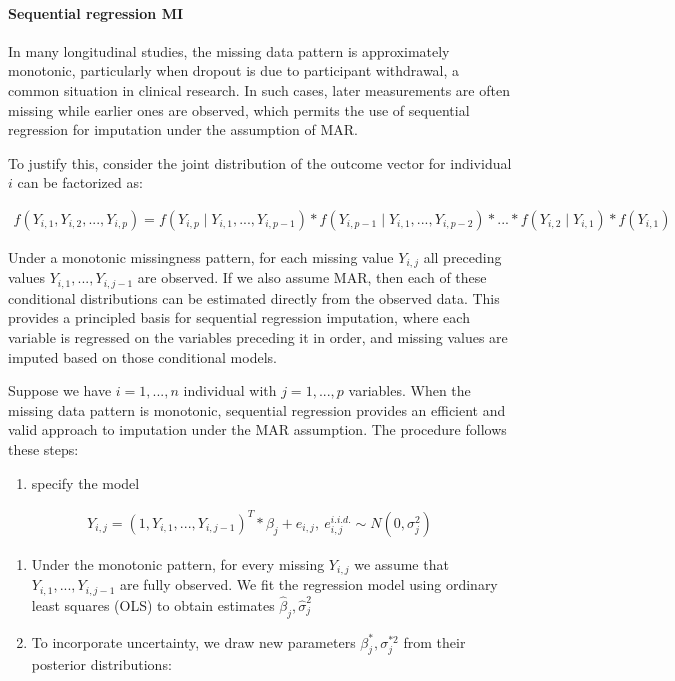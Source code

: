 \documentclass{article}
\providecommand{\tightlist}{%
  \setlength{\itemsep}{0pt}\setlength{\parskip}{0pt}}
\begin{document}
\paragraph{Sequential regression MI}\label{sequential-regression-mi}

In many longitudinal studies, the missing data pattern is approximately
monotonic, particularly when dropout is due to participant withdrawal, a
common situation in clinical research. In such cases, later measurements
are often missing while earlier ones are observed, which permits the use
of sequential regression for imputation under the assumption of MAR.

To justify this, consider the joint distribution of the outcome vector
for individual \(i\) can be factorized as:

\begin{align*}
    f(Y_{i,1},Y_{i,2},...,Y_{i,p}) = f(Y_{i,p} \mid Y_{i,1},...,Y_{i,p-1}) * 
    f(Y_{i,p-1} \mid Y_{i,1},...,Y_{i,p-2}) * ... * f(Y_{i,2} \mid Y_{i,1}) 
    * f(Y_{i,1})
    \end{align*}

Under a monotonic missingness pattern, for each missing value
\(Y_{i,j}\) all preceding values \(Y_{i,1},...,Y_{i,j-1}\) are observed.
If we also assume MAR, then each of these conditional distributions can
be estimated directly from the observed data. This provides a principled
basis for sequential regression imputation, where each variable is
regressed on the variables preceding it in order, and missing values are
imputed based on those conditional models.

Suppose we have \(i=1,...,n\) individual with \(j=1,...,p\) variables.
When the missing data pattern is monotonic, sequential regression
provides an efficient and valid approach to imputation under the MAR
assumption. The procedure follows these steps:

\begin{enumerate}
\def\labelenumi{\arabic{enumi}.}
\tightlist
\item
  specify the model
\end{enumerate}

\begin{align*}    
    Y_{i,j} = (1,Y_{i,1},...,Y_{i,j-1})^{T} * \beta_{j} + 
    e_{i,j},\ {e_{i,j}^{i.i.d.} \sim{N} (0,\sigma^{2}_{j})}
    \end{align*}

\begin{enumerate}
\def\labelenumi{\arabic{enumi}.}
\setcounter{enumi}{1}
\item
  Under the monotonic pattern, for every missing \(Y_{i,j}\) we assume
  that \(Y_{i,1},...,Y_{i,j-1}\) are fully observed. We fit the
  regression model using ordinary least squares (OLS) to obtain
  estimates \(\hat{\beta}_{j},\hat{\sigma}_{j}^{2}\)
\item
  To incorporate uncertainty, we draw new parameters
  \(\beta_{j}^{*},\sigma_{j}^{*2}\) from their posterior distributions:
\end{enumerate}
\end{document}
